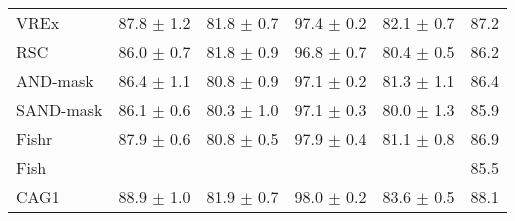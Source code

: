 \documentclass{article}
\begin{document}
\begin{center}
{\begin{tabular}{lccccc}
VREx                 & 87.8 $\pm$ 1.2       & 81.8 $\pm$ 0.7       & 97.4 $\pm$ 0.2       & 82.1 $\pm$ 0.7       & 87.2                 \\
RSC                  & 86.0 $\pm$ 0.7       & 81.8 $\pm$ 0.9       & 96.8 $\pm$ 0.7       & 80.4 $\pm$ 0.5       & 86.2                 \\
AND-mask             & 86.4 $\pm$ 1.1       & 80.8 $\pm$ 0.9       & 97.1 $\pm$ 0.2       & 81.3 $\pm$ 1.1       & 86.4                 \\
SAND-mask            & 86.1 $\pm$ 0.6       & 80.3 $\pm$ 1.0       & 97.1 $\pm$ 0.3       & 80.0 $\pm$ 1.3       & 85.9                 \\
Fishr                & 87.9 $\pm$ 0.6       & 80.8 $\pm$ 0.5       & 97.9 $\pm$ 0.4       & 81.1 $\pm$ 0.8       & 86.9                 \\
Fish                 &                      &                      &                      &                      & 85.5                 \\
\midrule
CAG1                 & 88.9 $\pm$ 1.0       & 81.9 $\pm$ 0.7       & 98.0 $\pm$ 0.2       & 83.6 $\pm$ 0.5       & 88.1                 \\

\bottomrule
\end{tabular}}
\end{center}
    
\end{document}
